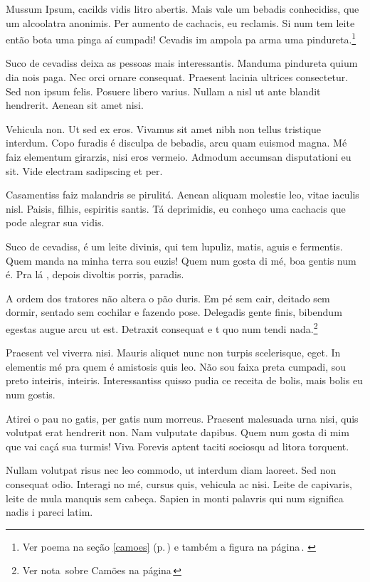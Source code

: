 Mussum Ipsum, cacilds vidis litro abertis. Mais vale um bebadis conhecidiss,
que um alcoolatra anonimis. Per aumento de cachacis, eu reclamis. Si num tem
leite então bota uma pinga aí cumpadi! Cevadis im ampola pa arma uma pindureta.\footnote{Ver poema na 
		seção \ref{camoes} (p.\,\pageref{camoes}) e também 
		a figura na página\,\pageref{fig:camoes}.
		\label{notasobrecamoes}}

Suco de cevadiss deixa as pessoas mais interessantis. Manduma pindureta quium
dia nois paga. Nec orci ornare consequat. Praesent lacinia ultrices
consectetur. Sed non ipsum felis. Posuere libero varius. Nullam a nisl ut ante
blandit hendrerit. Aenean sit amet nisi.

Vehicula non. Ut sed ex eros. Vivamus sit amet nibh non tellus tristique
interdum. Copo furadis é disculpa de bebadis, arcu quam euismod magna. Mé faiz
elementum girarzis, nisi eros vermeio. Admodum accumsan disputationi eu sit.
Vide electram sadipscing et per.

Casamentiss faiz malandris se pirulitá. Aenean aliquam molestie leo, vitae
iaculis nisl. Paisis, filhis, espiritis santis. Tá deprimidis, eu conheço uma
cachacis que pode alegrar sua vidis.

Suco de cevadiss, é um leite divinis, qui tem lupuliz, matis, aguis e
fermentis. Quem manda na minha terra sou euzis! Quem num gosta di mé, boa
gentis num é. Pra lá , depois divoltis porris, paradis.

A ordem dos tratores não altera o pão duris. Em pé sem cair, deitado sem
dormir, sentado sem cochilar e fazendo pose. Delegadis gente finis, bibendum
egestas augue arcu ut est. Detraxit consequat e
t quo num tendi nada.\footnote{Ver nota\, sobre Camões
	na página\,\pageref{notasobrecamoes} }

Praesent vel viverra nisi. Mauris aliquet nunc non turpis scelerisque, eget. In
elementis mé pra quem é amistosis quis leo. Não sou faixa preta cumpadi, sou
preto inteiris, inteiris. Interessantiss quisso pudia ce receita de bolis, mais
bolis eu num gostis.

Atirei o pau no gatis, per gatis num morreus. Praesent malesuada urna nisi,
quis volutpat erat hendrerit non. Nam vulputate dapibus. Quem num gosta di mim
que vai caçá sua turmis! Viva Forevis aptent taciti sociosqu ad litora
torquent.

Nullam volutpat risus nec leo commodo, ut interdum diam laoreet. Sed non
consequat odio. Interagi no mé, cursus quis, vehicula ac nisi. Leite de
capivaris, leite de mula manquis sem cabeça. Sapien in monti palavris qui num
significa nadis i pareci latim.

